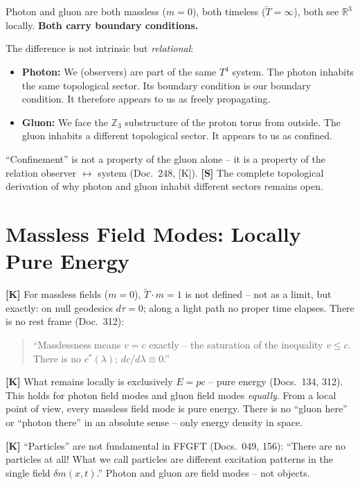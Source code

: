 \begin{keyresult}
Photon and gluon are both massless ($m=0$), both timeless
($\tilde{T}=\infty$), both see $\mathbb{R}^3$ locally.
\textbf{Both carry boundary conditions.}

The difference is not intrinsic but \emph{relational}:
\begin{itemize}
  \item \textbf{Photon:} We (observers) are part of the same
    $T^4$ system. The photon inhabits the same topological sector.
    Its boundary condition is our boundary condition. It therefore
    appears to us as freely propagating.
  \item \textbf{Gluon:} We face the $\mathbb{Z}_3$ substructure
    of the proton torus from outside. The gluon inhabits a different
    topological sector. It appears to us as confined.
\end{itemize}
``Confinement'' is not a property of the gluon alone -- it is a
property of the relation observer $\leftrightarrow$ system
(Doc.~248, [K]). \textbf{[S]} The complete topological derivation of
why photon and gluon inhabit different sectors remains open.
\end{keyresult}

\section{Massless Field Modes: Locally Pure Energy}

\textbf{[K]} For massless fields ($m=0$), $\tilde{T}\cdot m=1$ is not
defined -- not as a limit, but exactly: on null geodesics $d\tau=0$;
along a light path no proper time elapses. There is no rest frame
(Doc.~312):
\begin{quote}
``Masslessness means $v=c$ exactly -- the saturation of the
inequality $v\le c$. There is no $c^*(\lambda)$;
$dc/d\lambda\equiv 0$.''
\end{quote}

\textbf{[K]} What remains locally is exclusively $E=pc$ -- pure energy
(Docs.~134, 312). This holds for photon field modes and gluon field
modes \emph{equally}. From a local point of view, every massless field
mode is pure energy. There is no ``gluon here'' or ``photon there'' in
an absolute sense -- only energy density in space.

\textbf{[K]} ``Particles'' are not fundamental in FFGFT (Docs.~049, 156):
``There are no particles at all! What we call particles are different
excitation patterns in the single field $\delta m(x,t)$.'' Photon and
gluon are field modes -- not objects.


